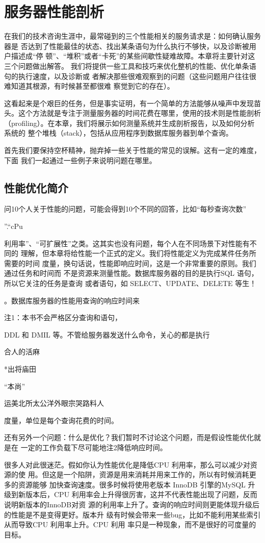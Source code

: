 \chapter{服务器性能剖析}
在我们的技术咨询生涯中，最常碰到的三个性能相关的服务请求是：如何确认服务器是
否达到了性能最佳的状态、找出某条语句为什么执行不够快，以及诊断被用户描述成“停
顿”、“堆积”或者“卡死”的某些间歇性疑难故障。本章将主要针对这三个问题做出解答。
我们将提供一些工具和技巧来优化整机的性能、优化单条语句的执行速度，以及诊断或
者解决那些很难观察到的问题（这些问题用户往往很难知道其根源，有时候甚至都很难
察觉到它的存在）。

这看起来是个艰巨的任务，但是事实证明，有一个简单的方法能够从噪声中发现苗
头。这个方法就是专注于测量服务器的时间花费在哪里，使用的技术则是性能剖析
（profiling）。在本章，我们将展示如何测量系统并生成剖析报告，以及如何分析系统的
整个堆栈（stack），包括从应用程序到数据库服务器到单个查询。

首先我们要保持空杯精神，抛弃掉一些关于性能的常见的误解。这有一定的难度，下面
我们一起通过一些例子来说明问题在哪里。

\section{性能优化简介}
问10个人关于性能的问题，可能会得到10个不同的回答，比如“每秒查询次数”

”.“cPu

利用率”、“可扩展性”之类。这其实也没有问题，每个人在不同场景下对性能有不同的
理解，但本章将给性能一个正式的定义。我们将性能定义为完成某件任务所需要的时间
度量，换句话说，性能即响应时间，这是一个非常重要的原则。我们通过任务和时间而
不是资源来测量性能。数据库服务器的目的是执行SQL 语句，所以它关注的任务是查询
或者语句，如 SELECT、UPDATE、DELETE 等生！

。数据库服务器的性能用查询的响应时间来

注1：本书不会严格区分查询和语句，

DDL 和 DMIL 等。不管给服务器发送什么命令，关心的都是执行

合人的活麻

*出将庙田

“本尚”

运美北所太公洋外眼宗哭路料人

度量，单位是每个查询花费的时间。

还有另外一个问题：什么是优化？我们暂时不讨论这个问题，而是假设性能优化就是在
一定的工作负载下尽可能地注2降低响应时间。

很多人对此很迷茫。假如你认为性能优化是降低CPU 利用率，那么可以减少对资源的使
用。但这是一个陷阱，资源是用来消耗并用来工作的，所以有时候消耗更多的资源能够
加快查询速度。很多时候将使用老版本 InnoDB 引擎的MySQL 升级到新版本后，CPU
利用率会上升得很厉害，这并不代表性能出现了问题，反而说明新版本的InnoDB对资
源的利用率上升了。查询的响应时间则更能体现升级后的性能是不是变得更好。版本升
级有时候会带来一些bug，比如不能利用某些索引从而导致CPU 利用率上升。CPU 利用
率只是一种现象，而不是很好的可度量的目标。

